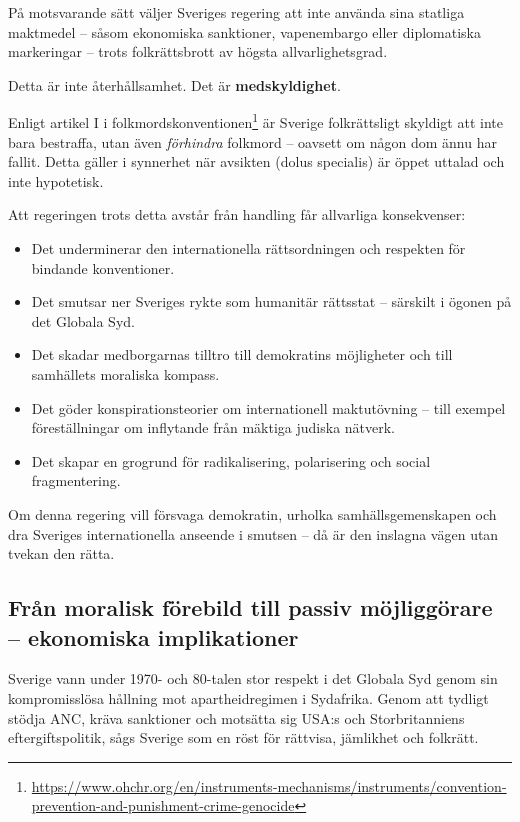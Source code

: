 På motsvarande sätt väljer Sveriges regering att inte använda sina statliga maktmedel – såsom ekonomiska sanktioner, vapenembargo eller diplomatiska markeringar – trots folkrättsbrott av högsta allvarlighetsgrad.

Detta är inte återhållsamhet. Det är \textbf{medskyldighet}.

Enligt artikel I i folkmordskonventionen\footnote{\url{https://www.ohchr.org/en/instruments-mechanisms/instruments/convention-prevention-and-punishment-crime-genocide}} är Sverige folkrättsligt skyldigt att inte bara bestraffa, utan även \textit{förhindra} folkmord – oavsett om någon dom ännu har fallit. Detta gäller i synnerhet när avsikten (dolus specialis) är öppet uttalad och inte hypotetisk.

Att regeringen trots detta avstår från handling får allvarliga konsekvenser:

\begin{itemize}
  \item Det underminerar den internationella rättsordningen och respekten för bindande konventioner.
  \item Det smutsar ner Sveriges rykte som humanitär rättsstat – särskilt i ögonen på det Globala Syd.
  \item Det skadar medborgarnas tilltro till demokratins möjligheter och till samhällets moraliska kompass.
  \item Det göder konspirationsteorier om internationell maktutövning – till exempel föreställningar om inflytande från mäktiga judiska nätverk.
  \item Det skapar en grogrund för radikalisering, polarisering och social fragmentering.
\end{itemize}

Om denna regering vill försvaga demokratin, urholka samhällsgemenskapen och dra Sveriges internationella anseende i smutsen – då är den inslagna vägen utan tvekan den rätta.






\subsection*{Från moralisk förebild till passiv möjliggörare – ekonomiska implikationer}

Sverige vann under 1970- och 80-talen stor respekt i det Globala Syd genom sin kompromisslösa hållning mot apartheidregimen i Sydafrika. Genom att tydligt stödja ANC, kräva sanktioner och motsätta sig USA:s och Storbritanniens eftergiftspolitik, sågs Sverige som en röst för rättvisa, jämlikhet och folkrätt.

